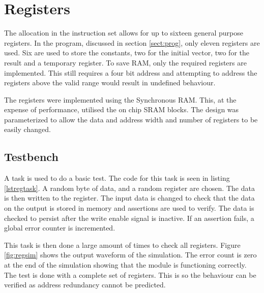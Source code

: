 
\section{Registers}\label{sect:regs}

The allocation in the instruction set allows for up to sixteen general purpose registers. 
In the program, discussed in section \ref{sect:prog}, only eleven registers are used. 
Six are used to store the constants, two for the initial vector, two for the result and a temporary register.
To save RAM, only the required registers are implemented.
This still requires a four bit address and attempting to address the registers above the valid range would result in undefined behaviour.

The registers were implemented using the Synchronous RAM.
This, at the expense of performance, utilised the on chip SRAM blocks. 
The design was parameterized to allow the data and address width and number of registers to be easily changed. 


\subsection{Testbench}

A task is used to do a basic test.
The code for this task is seen in listing \ref{lstregtask}.
A random byte of data, and a random register are chosen. 
The data is then written to the register. 
The input data is changed to check that the data on the output is stored in memory and assertions are used to verify. 
The data is checked to persist after the write enable signal is inactive. 
If an assertion fails, a global error counter is incremented.

This task is then done a large amount of times to check all registers. 
Figure \ref{fig:regsim} shows the output waveform of the simulation. 
The error count is zero at the end of the simulation showing that the module is functioning correctly.
The test is done with a complete set of registers. 
This is so the behaviour can be verified as address redundancy cannot be predicted.





